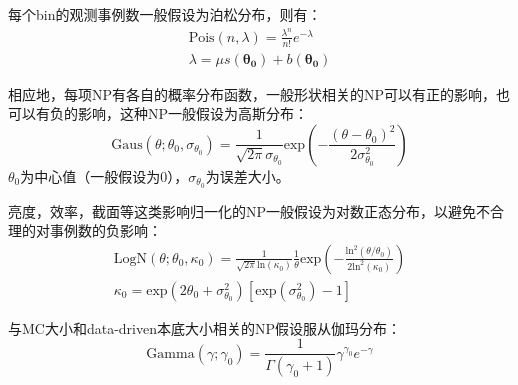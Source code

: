 每个bin的观测事例数一般假设为泊松分布，则有：
\begin{equation}
 \begin{aligned}
 \text{Pois}(n,\lambda)=\frac{\lambda^{n}}{{n}!}e^{-\lambda}\\
 \lambda=\mu s(\boldsymbol{\theta_0})+b(\boldsymbol{\theta_0})
 \end{aligned}
\end{equation}

相应地，每项NP有各自的概率分布函数，一般形状相关的NP可以有正的影响，也可以有负的影响，这种NP一般假设为高斯分布：
\begin{equation}
 \text{Gaus}(\theta;\theta_0,\sigma_{\theta_0})=\frac{1}{\sqrt{2\pi}\sigma_{\theta_0}}\text{exp}(-\frac{(\theta-\theta_0)^2}{2{\sigma^2_{\theta_0}}})
\end{equation}
$\theta_0$为中心值（一般假设为0），$\sigma_{\theta_0}$为误差大小。

亮度，效率，截面等这类影响归一化的NP一般假设为对数正态分布，以避免不合理的对事例数的负影响：
\begin{equation}
\begin{aligned}
 \text{LogN}(\theta;\theta_0,\kappa_0)=\frac{1}{\sqrt{2\pi}\text{ln}(\kappa_0)}\frac{1}{\theta}\text{exp}(-\frac{{\text{ln}^2(\theta/\theta_0)}}{{2\text{ln}^2(\kappa_0)}})\\
 \kappa_0=\text{exp}(2\theta_0+{\sigma^2_{\theta_0}})[\text{exp}({\sigma^2_{\theta_0}})-1]
\end{aligned}
\end{equation}

与MC大小和data-driven本底大小相关的NP假设服从伽玛分布：
\begin{equation}
 \text{Gamma}(\gamma;\gamma_0)=\frac{1}{\Gamma(\gamma_0+1)}\gamma^{\gamma_0}e^{-\gamma}
\end{equation}

